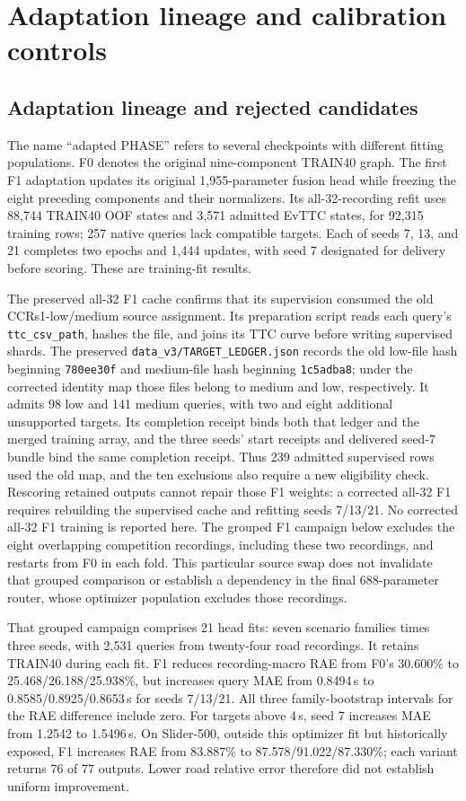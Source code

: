 \section{Adaptation lineage and calibration controls}
\label{app:adaptation-lineage}
\subsection{Adaptation lineage and rejected candidates}
The name ``adapted PHASE'' refers to several checkpoints with different fitting populations. F0 denotes the original nine-component TRAIN40 graph. The first F1 adaptation updates its original 1,955-parameter fusion head while freezing the eight preceding components and their normalizers. Its all-32-recording refit uses 88,744 TRAIN40 OOF states and 3,571 admitted EvTTC states, for 92,315 training rows; 257 native queries lack compatible targets. Each of seeds 7, 13, and 21 completes two epochs and 1,444 updates, with seed 7 designated for delivery before scoring. These are training-fit results. 

The preserved all-32 F1 cache confirms that its supervision consumed the old CCRs1-low/medium source assignment. Its preparation script reads each query's \texttt{ttc\_csv\_path}, hashes the file, and joins its TTC curve before writing supervised shards. The preserved \texttt{data\_v3/TARGET\_LEDGER.json} records the old low-file hash beginning \texttt{780ee30f} and medium-file hash beginning \texttt{1c5adba8}; under the corrected identity map those files belong to medium and low, respectively. It admits 98 low and 141 medium queries, with two and eight additional unsupported targets. Its completion receipt binds both that ledger and the merged training array, and the three seeds' start receipts and delivered seed-7 bundle bind the same completion receipt. Thus 239 admitted supervised rows used the old map, and the ten exclusions also require a new eligibility check. Rescoring retained outputs cannot repair those F1 weights: a corrected all-32 F1 requires rebuilding the supervised cache and refitting seeds 7/13/21. No corrected all-32 F1 training is reported here. The grouped F1 campaign below excludes the eight overlapping competition recordings, including these two recordings, and restarts from F0 in each fold. This particular source swap does not invalidate that grouped comparison or establish a dependency in the final 688-parameter router, whose optimizer population excludes those recordings. 

That grouped campaign comprises 21 head fits: seven scenario families times three seeds, with 2,531 queries from twenty-four road recordings. It retains TRAIN40 during each fit. F1 reduces recording-macro RAE from F0's 30.600\% to 25.468/26.188/25.938\%, but increases query MAE from 0.8494\,s to 0.8585/0.8925/0.8653\,s for seeds 7/13/21. All three family-bootstrap intervals for the RAE difference include zero. For targets above 4\,s, seed 7 increases MAE from 1.2542 to 1.5496\,s. On Slider-500, outside this optimizer fit but historically exposed, F1 increases RAE from 83.887\% to 87.578/91.022/87.330\%; each variant returns 76 of 77 outputs. Lower road relative error therefore did not establish uniform improvement. 

